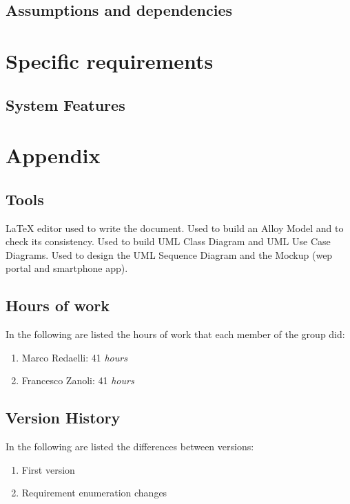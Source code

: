 \documentclass{../Common/Structure/doc_pdf}
\begin{document}
\section{Assumptions and dependencies}


\chapter{Specific requirements}


\section{System Features}




\appendix
\chapter{Appendix}

\section{Tools}
\begin{itemize}
	 \LaTeX{} editor used to write the document.
	 Used to build an Alloy Model and to check its consistency.
	 Used to build UML Class Diagram and UML Use Case Diagrams.
	 Used to design the UML Sequence Diagram and the Mockup (wep portal and smartphone app).

\end{itemize}
\newpage
\section{Hours of work}
In the following are listed the hours of work that each member of the group did:
\begin{enumerate}
	\item Marco Redaelli: 41 \emph{hours}
	\item Francesco Zanoli: 41 \emph{hours}
\end{enumerate}
\newpage
\section{Version History}
In the following are listed the differences between versions:
\begin{enumerate}
	\item First version
	\item Requirement enumeration changes
\end{enumerate}
\end{document}

